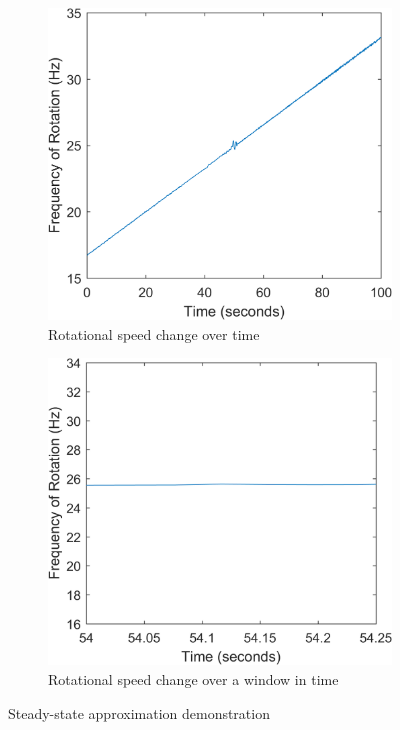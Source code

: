 		\begin{figure}[H]
			\begin{subfigure}[b]{.5\linewidth}	
				\centering
				\includegraphics[width=1\textwidth]{./figures/Images/Figure_9a}
				\caption{Rotational speed change over time}
				\label{fig:Figure_9a}
			\end{subfigure}
			\begin{subfigure}[b]{.5\linewidth}
				\centering
				\includegraphics[width=1\textwidth]{./figures/Images/Figure_9b}
				\caption{Rotational speed change over a window in time}
				\label{fig:Figure_9b}
			\end{subfigure}
			\caption{Steady-state approximation demonstration}
			\label{fig:Figure_9}
		\end{figure}
